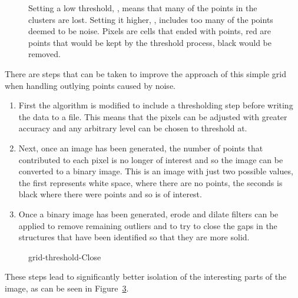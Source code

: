 \begin{figure}[ht]
\begin{subfigure}[b]{0.48\linewidth}
        \caption{}\label{fig:grid-noise-high.png}
    \end{subfigure}
    \caption{Setting a low threshold, , means
    that many of the points in the clusters are lost. Setting it higher,
    , includes too many of the points deemed to
    be noise. Pixels are cells that ended with points, red are points that
    would be kept by the threshold process, black would be
    removed.}\label{fig:grid-noise}
\end{figure}

There are steps that can be taken to improve the approach of this simple grid
when handling outlying points caused by noise.
\begin{enumerate}
	\item First the algorithm is modified to include a thresholding step before
	writing the data to a file. This means that the pixels can be adjusted with
	greater accuracy and any arbitrary level can be chosen to threshold at.
	\item Next, once an image has been generated, the number of points that
	contributed to each pixel is no longer of interest and so the image can be
	converted to a binary image. This is an image with just two possible
	values, the first represents white space, where there are no points, the
	seconds is black where there were points and so is of interest.
	\item Once a binary image has been generated, erode and dilate filters can
	be applied to remove remaining outliers and to try to close the gaps in the
	structures that have been identified so that they are more solid.
\end{enumerate}

\begin{figure}[tbhp]
	\centering
	\caption{grid-threshold-Close}
	\label{fig:grid-threshold-close}
\end{figure}

These steps lead to significantly better isolation of the interesting parts of
the image, as can be seen in Figure~\ref{fig:grid-threshold-close}.
